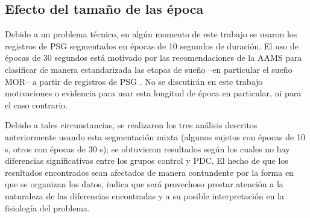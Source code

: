 
\subsection{Efecto del tama\~no de las \'epoca}

Debido a un problema t\'ecnico, en alg\'un momento de este trabajo se usaron los registros
de PSG segmentados en \'epocas de 10 segundos de duraci\'on.
El uso de \'epocas de 30 segundos est\'a motivado por las recomendaciones de la AAMS para 
clasificar de manera estandarizada las etapas de sue\~no --en particular el sue\~no MOR-- 
a partir de registros de PSG \cite{AASM07}. 
No se discutir\'an en este trabajo motivaciones o evidencia para usar esta longitud de 
\'epoca en particular, ni para el caso contrario. 

Debido a tales circunstancias, se realizaron
los tres an\'alisis descritos anteriormente usando esta segmentaci\'on mixta
(algunos sujetos con \'epocas de 10 s, otros con \'epocas de 30 s); se 
obtuvieron resultados seg\'un los cuales no hay diferencias significativas entre los grupos
control y PDC. %
El hecho de que los resultados encontrados sean afectados de manera contundente
por la forma en que se organizan los
datos, indica que ser\'a provechoso
prestar atenci\'on a la naturaleza de las diferencias encontradas y a su 
posible interpretaci\'on en la fisiolog\'ia del problema.


